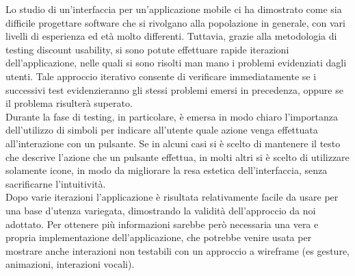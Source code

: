 Lo studio di un'interfaccia per un'applicazione mobile ci ha dimostrato come sia difficile
progettare software che si rivolgano alla popolazione in generale, con vari livelli di esperienza
ed età molto differenti. Tuttavia, grazie alla metodologia di testing discount usability, si sono potute
effettuare rapide iterazioni dell'applicazione, nelle quali si sono risolti man mano i problemi evidenziati
dagli utenti. Tale approccio iterativo consente di verificare immediatamente se
i successivi test evidenzieranno
gli stessi problemi emersi in precedenza, oppure se il problema risulterà superato.
\\
Durante la fase di testing, in particolare, è emersa in modo chiaro l'importanza dell'utilizzo di simboli per
indicare all'utente quale azione venga effettuata all'interazione con un pulsante. Se in alcuni casi si è scelto di mantenere
il testo che descrive l'azione che un pulsante effettua, in molti altri si è
scelto di utilizzare solamente icone, in modo
da migliorare la resa estetica dell'interfaccia, senza sacrificarne l'intuitività.
\\
Dopo varie iterazioni l'applicazione è risultata relativamente facile da usare per una base d'utenza variegata, dimostrando
la validità dell'approccio da noi adottato. Per ottenere più informazioni sarebbe però necessaria una vera e propria implementazione
dell'applicazione, che potrebbe venire usata per mostrare anche interazioni non
testabili con un approccio a wireframe (es gesture, animazioni,
interazioni vocali).
